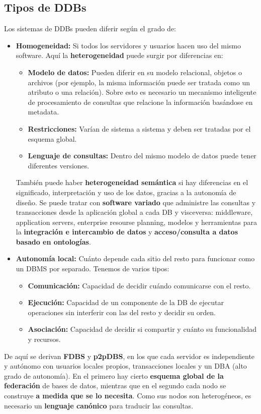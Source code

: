 \subsection*{Tipos de DDBs}
Los sistemas de DDBs pueden diferir según el grado de:
\begin{itemize}
    \item \textbf{Homogeneidad:} Si todos los servidores y usuarios hacen uso del mismo software. Aquí la \textbf{heterogeneidad} puede surgir por diferencias en:
    \begin{itemize}
        \item \textbf{Modelo de datos:} Pueden diferir en su modelo relacional, objetos o archivos (por ejemplo, la misma información puede ser tratada como un atributo o una relación). Sobre esto es necesario un mecanismo inteligente de procesamiento de consultas que relacione la información basándose en metadata.
        \item \textbf{Restricciones:} Varían de sistema a sistema y deben ser tratadas por el esquema global.
        \item \textbf{Lenguaje de consultas:} Dentro del mismo modelo de datos puede tener diferentes versiones.
    \end{itemize}
    También puede haber \textbf{heterogeneidad semántica} si hay diferencias en el significado, interpretación y uso de los datos, gracias a la autonomía de diseño. Se puede tratar con \textbf{software variado} que administre las consultas y transacciones desde la aplicación global a cada DB y visceversa: middleware, application servers, enterprise resourse planning, modelos y herramientas para la \textbf{integración e intercambio de datos} y \textbf{acceso/consulta a datos basado en ontologías}.
    \item \textbf{Autonomía local:} Cuánto depende cada sitio del resto para funcionar como un DBMS por separado. Tenemos de varios tipos:
    \begin{itemize}
        \item \textbf{Comunicación:} Capacidad de decidir cuándo comunicarse con el resto.
        \item \textbf{Ejecución:} Capacidad de un componente de la DB de ejecutar operaciones sin interferir con las del resto y decidir su orden.
        \item \textbf{Asociación:} Capacidad de decidir si compartir y cuánto su funcionalidad y recursos.
    \end{itemize}
\end{itemize}
De aquí se derivan \textbf{FDBS} y \textbf{p2pDBS}, en los que cada servidor es independiente y autónomo con usuarios locales propios, transacciones locales y un DBA (alto grado de autonomía). En el primero hay cierto \textbf{esquema global de la federación} de bases de datos, mientras que en el segundo cada nodo se construye \textbf{a medida que se lo necesita}. Como sus nodos son heterogéneos, es necesario un \textbf{lenguaje canónico} para traducir las consultas.

